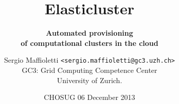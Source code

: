 \documentclass[english,serif,mathserif,usenames,dvipsnames]{beamer}
\begin{document}
\title[elasticluster]{Elasticluster}
\subtitle{\textbf{Automated provisioning \\ of computational clusters in the cloud}}

\author[S. Maffioletti]{Sergio Maffioletti \texttt{<sergio.maffioletti@gc3.uzh.ch>} \\
GC3: Grid Computing Competence Center \\
University of Zurich.}
\date{CHOSUG 06 December 2013}



\maketitle
\end{document}
